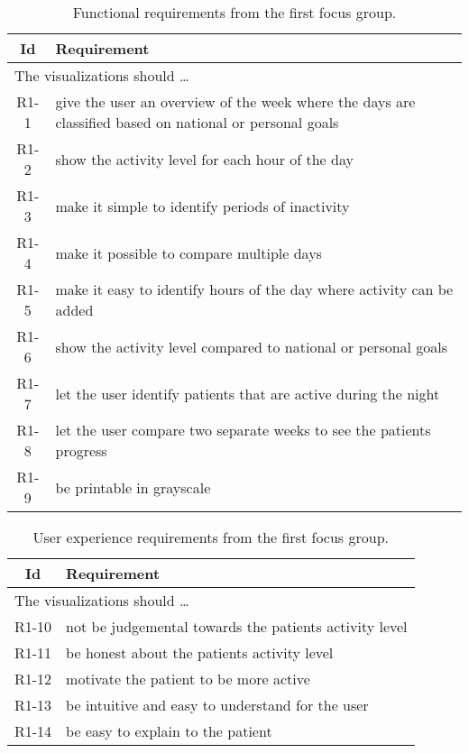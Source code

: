 \clearpage
\begin{table}[t]
  \begin{center}
  \begin{tabular}{|c|p{12cm}|}
    \hline
      \textbf{Id} & \textbf{Requirement} \\ \hline
    \multicolumn{2}{|l|}{The visualizations should \ldots} \\ \hline
      R1-1 & give the user an overview of the week where the days are classified based on national or personal goals \\ \hline
      R1-2 & show the activity level for each hour of the day \\ \hline
      R1-3 & make it simple to identify periods of inactivity \\ \hline
      R1-4 & make it possible to compare multiple days \\ \hline
      R1-5 & make it easy to identify hours of the day where activity can be added \\ \hline
      R1-6 & show the activity level compared to national or personal goals \\ \hline
      R1-7 & let the user identify patients that are active during the night \\ \hline
      R1-8 & let the user compare two separate weeks to see the patients progress \\ \hline
      R1-9 & be printable in grayscale \\ \hline
  \end{tabular}
  \end{center}
  \caption[Functional requirements after the first focus group.]{Functional requirements from the first focus group.}
  \label{tab:functionalReqFirstFocus}
\end{table}

\begin{table}[t]
  \begin{center}
  \begin{tabular}{|c|p{12cm}|}
    \hline
      \textbf{Id} & \textbf{Requirement} \\ \hline
    \multicolumn{2}{|l|}{The visualizations should \ldots} \\ \hline
      R1-10 & not be judgemental towards the patients activity level \\ \hline
      R1-11 & be honest about the patients activity level \\ \hline
      R1-12 & motivate the patient to be more active \\ \hline
      R1-13 & be intuitive and easy to understand for the user \\ \hline
      R1-14 & be easy to explain to the patient \\ \hline
  \end{tabular}
  \end{center}
  \caption[User experience requirements after the first focus group.]{User experience requirements from the first focus group.}
  \label{tab:uxReqFirstFocus}
\end{table}

